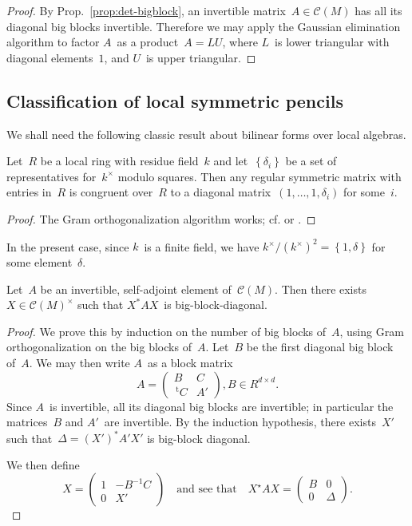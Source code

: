 \documentclass{lms}%
\let\ro\mathscr
\def\transpose{\,{}^{\mathrm{t}\!}}
\def\acco#1{\left\{#1\right\}}
\def\mat#1{\begin{pmatrix}#1\end{pmatrix}}
\begin{document}
\begin{proof}
By Prop.~\ref{prop:det-bigblock}, an invertible matrix~$A ∈ \ro C(M)$ has
all its diagonal big blocks invertible. Therefore we may apply the
Gaussian elimination algorithm to factor $A$~as a product~$A = LU$, where
$L$~is lower triangular with diagonal elements~$1$, and $U$~is upper
triangular.
\end{proof}%

\subsection{Classification of local symmetric pencils}%

We shall need the following classic result about bilinear forms over
local algebras.

\begin{prop}\label{prop:local-diag}%
Let~$R$ be a local ring with residue field~$k$ and let~$\acco{δ_i}$ be a
set of representatives for~$k^{×}$ modulo squares. Then any regular
symmetric matrix with entries in~$R$ is congruent over~$R$ to a
diagonal matrix~$(1, …, 1, δ_i)$ for some~$i$.
\end{prop}

\begin{proof}
The Gram orthogonalization algorithm works; cf.
\cite[I(3.4)]{milnorhusemoller} or \cite[92:1]{omeara}.
\end{proof}

In the present case, since $k$~is a finite field, we have $k^{×} /
(k^{×})^2 = \acco {1, δ}$ for some element~$δ$.
\begin{prop}\label{prop:bb-diag}%
Let~$A$ be an invertible, self-adjoint element of~$\ro C(M)$. Then there
exists $X ∈ \ro C(M)^{×}$ such that $X^{*} A X$~is big-block-diagonal.
\end{prop}

\begin{proof}
We prove this by induction on the number of big blocks of~$A$, using Gram
orthogonalization on the big blocks of~$A$. Let~$B$ be the first diagonal
big block of~$A$. We may then write $A$~as a block matrix
\begin{equation}
A = \mat{B & C \\ \transpose{C} & A'}, B ∈ R^{d×d}.
\end{equation}
Since $A$~is invertible, all its diagonal big blocks are invertible; in
particular the matrices~$B$ and $A'$~are invertible. By the induction
hypothesis, there exists~$X'$ such that~$Δ = (X')^{*} A' X'$ is
big-block diagonal.

We then define
\begin{equation}
X = \mat{1 & -B^{-1} C\\0 & X'}\quad\text{and see that}\quad
X^{⋆} A X = \mat{B & 0\\0 & Δ}.
\end{equation}
\end{proof}
\end{document}
